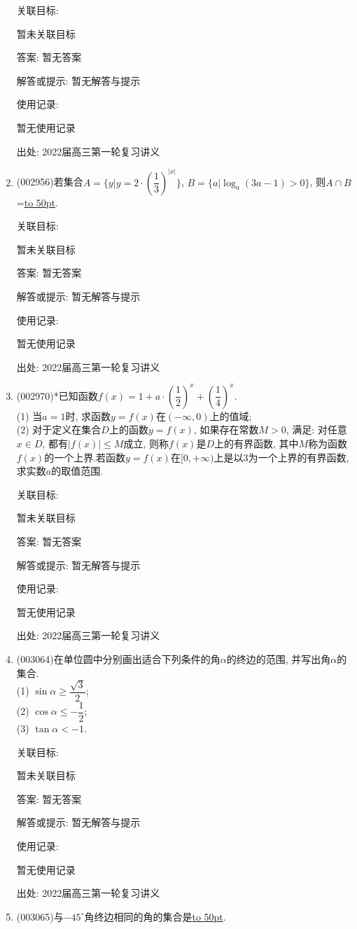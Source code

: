 \documentclass[10pt,a4paper]{article}
\newcommand{\blank}[1]{\underline{\hbox to #1pt{}}}
\begin{document}
\begin{enumerate}[1.]
关联目标:

暂未关联目标

答案: 暂无答案

解答或提示: 暂无解答与提示

使用记录:

暂无使用记录


出处: 2022届高三第一轮复习讲义
\item { (002956)}若集合$A=\{y|y=2\cdot (\dfrac 13)^{|x|}\}$, $B=\{ a|\log_a(3a-1)>0\}$, 则$A\cap B$=\blank{50}.


关联目标:

暂未关联目标

答案: 暂无答案

解答或提示: 暂无解答与提示

使用记录:

暂无使用记录


出处: 2022届高三第一轮复习讲义
\item { (002970)}*已知函数$f(x)=1+a\cdot (\dfrac 12)^x+(\dfrac 14)^x$.\\
(1) 当$a=1$时, 求函数$y=f(x)$在$(-\infty,0)$上的值域;\\
(2) 对于定义在集合$D$上的函数$y=f(x)$, 如果存在常数$M>0$, 满足: 对任意$x\in D$, 都有$|f(x)|\le M$成立, 则称$f(x)$是$D$上的有界函数, 其中$M$称为函数$f(x)$的一个上界.若函数$y=f(x)$在$[0,+\infty)$上是以$3$为一个上界的有界函数, 求实数$a$的取值范围.


关联目标:

暂未关联目标

答案: 暂无答案

解答或提示: 暂无解答与提示

使用记录:

暂无使用记录


出处: 2022届高三第一轮复习讲义
\item { (003064)}在单位圆中分别画出适合下列条件的角$\alpha$的终边的范围, 并写出角$\alpha$的集合.\\
(1) $\sin\alpha\ge \dfrac{\sqrt 3}2$;\\
(2) $\cos\alpha\le -\dfrac 12$;\\
(3) $\tan\alpha<-1$.


关联目标:

暂未关联目标

答案: 暂无答案

解答或提示: 暂无解答与提示

使用记录:

暂无使用记录


出处: 2022届高三第一轮复习讲义
\item { (003065)}与$-45^\circ$角终边相同的角的集合是\blank{50}.



\end{enumerate}
\end{document}
